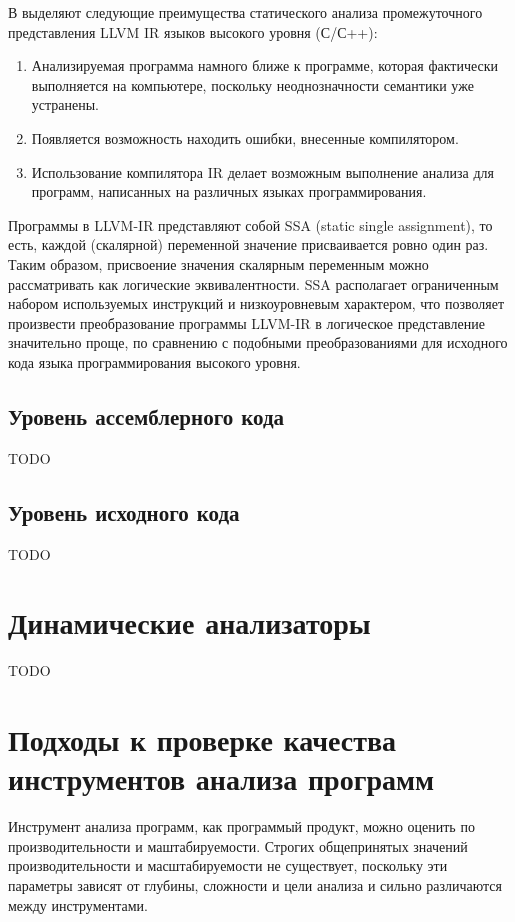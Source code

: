 В \cite{10.1007/978-3-642-27705-4_12} выделяют следующие преимущества статического анализа промежуточного представления LLVM IR языков высокого уровня (С/С++):
\begin{enumerate}
    \item Анализируемая программа намного ближе к программе, которая фактически выполняется на компьютере, поскольку неоднозначности семантики уже 
          устранены. 
    \item Появляется возможность находить ошибки, внесенные компилятором.
    \item Использование компилятора IR делает возможным выполнение анализа для программ, написанных на различных языках программирования.
\end{enumerate}

Программы в LLVM-IR представляют собой SSA (static single assignment), то есть, каждой (скалярной) переменной значение присваивается ровно один раз.
Таким образом, присвоение значения скалярным переменным можно рассматривать как логические эквивалентности. SSA располагает ограниченным набором 
используемых инструкций и  низкоуровневым характером, что позволяет произвести преобразование программы LLVM-IR в логическое представление значительно 
проще, по сравнению с подобными преобразованиями для исходного кода языка программирования высокого уровня\cite{10.1007/978-3-642-27705-4_12}.


\subsection{Уровень ассемблерного кода}
TODO
        
\subsection{Уровень исходного кода}
TODO

\section{Динамические анализаторы}
TODO

\section{Подходы к проверке качества инструментов анализа программ}
Инструмент анализа программ, как программый продукт, можно оценить по производительности и маштабируемости. 
Строгих общепринятых значений производительности и масштабируемости не существует, поскольку эти параметры зависят от глубины, сложности и цели анализа и сильно различаются между инструментами. 

